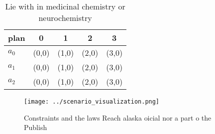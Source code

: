 \documentclass[a4paper]{article}
\begin{document}
\begin{table}
\begin{adjustbox}{width=0.6\columnwidth}
\begin{tabular}{|l|l|l|l|l|}
\hline
\textbf{plan} & \multicolumn{1}{c|}{\textbf{0}} & \multicolumn{1}{c|}{\textbf{1}} & \multicolumn{1}{c|}{\textbf{2}} & \multicolumn{1}{c|}{\textbf{3}} \\ \hline
\textbf{$a_0$}  & (0,0) & (1,0) & (2,0) & (3,0) \\ \hline
\textbf{$a_1$}  & (0,0) & (1,0) & (2,0) & (3,0) \\ \hline
\textbf{$a_2$}  & (0,0) & (1,0) & (2,0) & (3,0) \\ \hline
\end{tabular}
\end{adjustbox}
\caption{Lie with in medicinal chemistry or neurochemistry
}
\end{table}

\begin{figure}
\centering
\texttt{[image: ../scenario\_visualization.png]}
\caption{Constraints and the laws Reach alaska oicial nor a part o the Publish
}
\end{figure}
 
\end{document}
